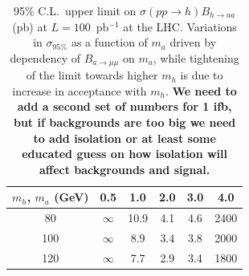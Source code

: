\documentclass[aps,prl,twocolumn,nofootinbib,superscriptaddress]{revtex4}
\begin{document}
{\begin{table}[htbp]
\caption{95\% C.L.\ upper limit on $\sigma(pp \to h) B_{h \to aa}$ (pb) at $L = 100$~pb$^{-1}$ at the LHC. Variations in $\sigma_{\mbox{95\%}}$ as a function of $m_a$ driven by dependency of $B_{a\to\mu\mu}$ on $m_a$, while tightening of the limit towards higher $m_h$ is due to increase in acceptance with $m_h$. {\bf We need to add a second set of numbers for 1 ifb, but if backgrounds are too big we need to add isolation or at least some educated guess on how isolation will affect backgrounds and signal.} \label{table_both_factorized}}
\begin{center}
\renewcommand{\arraystretch}{1.3}
\begin{tabular}{| c | c | c | c | c | c |}
\hline
\mbox{\hspace{0.25 cm}}$m_h$, $m_a$ (GeV)\mbox{\hspace{0.25 cm}} & \mbox{\hspace{0.25 cm}}0.5\mbox{\hspace{0.25 cm}} & \mbox{\hspace{0.25 cm}}1.0\mbox{\hspace{0.25 cm}} & \mbox{\hspace{0.25 cm}}2.0\mbox{\hspace{0.25 cm}} & \mbox{\hspace{0.25 cm}}3.0\mbox{\hspace{0.25 cm}} & \mbox{\hspace{0.25 cm}}4.0\mbox{\hspace{0.25 cm}} \\\hline
80 & $\infty$ & 10.9 & 4.1 & 4.6 & 2400 \\\hline
100 & $\infty$ & 8.9 & 3.4 & 3.8 & 2000 \\\hline
120 & $\infty$ & 7.7 & 2.9 & 3.4 & 1800 \\\hline
\end{tabular}
\end{center}
\end{table}


}
\end{document}
